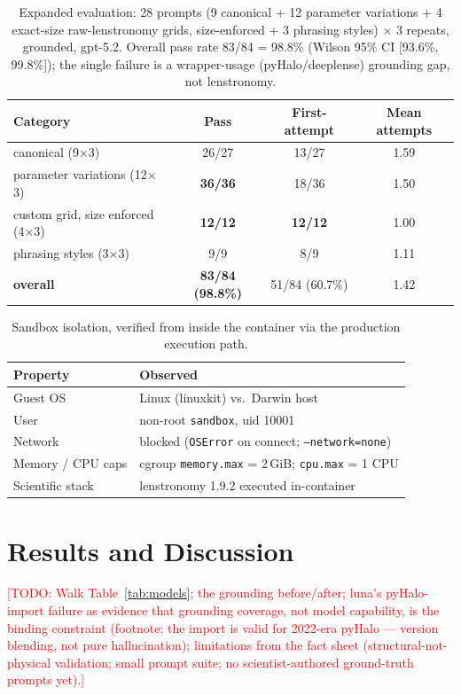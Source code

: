 \documentclass{article}
\newcommand{\todo}[1]{\textcolor{red}{[TODO: #1]}}
\begin{document}
\begin{table}[t]
  \caption{Expanded evaluation: 28 prompts (9 canonical + 12 parameter variations
  + 4 exact-size raw-lenstronomy grids, size-enforced + 3 phrasing styles)
  $\times$ 3 repeats, grounded, gpt-5.2. Overall pass rate 83/84 = 98.8\%
  (Wilson 95\% CI [93.6\%, 99.8\%]); the single failure is a wrapper-usage
  (pyHalo/deeplense) grounding gap, not lenstronomy.}
  \label{tab:expanded}
  \centering
  \small
  \begin{tabular}{lccc}
    \toprule
    Category & Pass & First-attempt & Mean attempts \\
    \midrule
    canonical (9$\times$3) & 26/27 & 13/27 & 1.59 \\
    parameter variations (12$\times$3) & \textbf{36/36} & 18/36 & 1.50 \\
    custom grid, size enforced (4$\times$3) & \textbf{12/12} & \textbf{12/12} & 1.00 \\
    phrasing styles (3$\times$3) & 9/9 & 8/9 & 1.11 \\
    \midrule
    \textbf{overall} & \textbf{83/84 (98.8\%)} & 51/84 (60.7\%) & 1.42 \\
    \bottomrule
  \end{tabular}
\end{table}

\begin{table}[t]
  \caption{Sandbox isolation, verified from inside the container via the
  production execution path.}
  \label{tab:isolation}
  \centering
  \small
  \begin{tabular}{ll}
    \toprule
    Property & Observed \\
    \midrule
    Guest OS & Linux (linuxkit) vs.\ Darwin host \\
    User & non-root \texttt{sandbox}, uid 10001 \\
    Network & blocked (\texttt{OSError} on connect; \texttt{--network=none}) \\
    Memory / CPU caps & cgroup \texttt{memory.max} = 2\,GiB; \texttt{cpu.max} = 1 CPU \\
    Scientific stack & lenstronomy 1.9.2 executed in-container \\
    \bottomrule
  \end{tabular}
\end{table}

\section{Results and Discussion}
\label{sec:results}
\todo{Walk Table~\ref{tab:models}; the grounding before/after; luna's
pyHalo-import failure as evidence that grounding coverage, not model capability,
is the binding constraint (footnote: the import is valid for 2022-era pyHalo —
version blending, not pure hallucination); limitations from the fact sheet
(structural-not-physical validation; small prompt suite; no scientist-authored
ground-truth prompts yet).}
\end{document}
